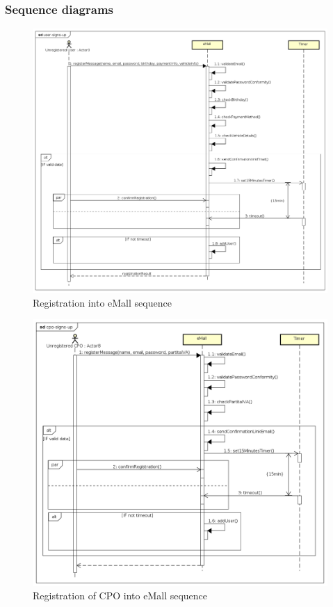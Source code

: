 \subsubsection{Sequence diagrams}
\begin{figure}[!h]
    \begin{center}
        \includegraphics[keepaspectratio, width=16cm]{Sequence/user-signs-up.png}
        \caption{Registration into \ac{eMall} sequence}
    \end{center}
\end{figure}
\begin{figure}[!h]
    \begin{center}
        \includegraphics[keepaspectratio, width=16cm]{Sequence/cpo-signs-up.png}
        \caption{Registration of \ac{CPO} into \ac{eMall} sequence}
    \end{center}
\end{figure}
